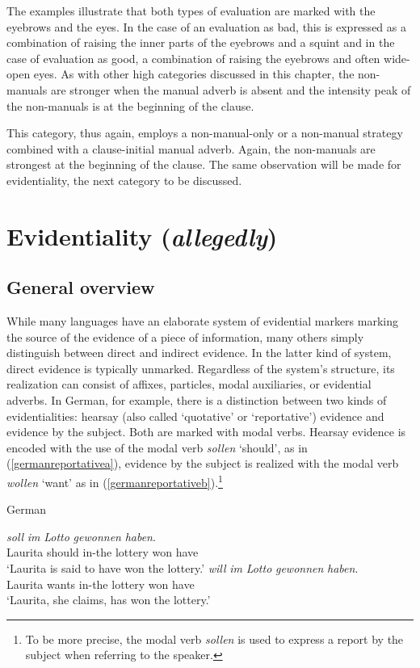 \noindent The examples illustrate that both types of evaluation are marked with the eyebrows and the eyes. In the case of an evaluation as bad, this is expressed as a combination of raising the inner parts of the eyebrows and a squint and in the case of evaluation as good, a combination of raising the eyebrows and often wide-open eyes.  As with other high categories discussed in this chapter, the non-manuals are stronger when the manual adverb is absent and the intensity peak of the non-manuals is at the beginning of the clause. 


This category, thus again, employs a non-manual-only or a non-manual strategy combined with a clause-initial manual adverb. Again, the non-manuals are strongest at the beginning of the clause. The same observation will be made for evidentiality, the next category to be discussed.

\section{Evidentiality (\textit{allegedly})}\label{evidentiality}


\subsection{General overview}

While many languages have an elaborate system of evidential markers marking the source of the evidence of a piece of information, many others simply distinguish between direct and indirect evidence. In the latter kind of system, direct evidence is typically unmarked. Regardless of the system's structure, its realization can consist of affixes, particles, modal auxiliaries, or evidential adverbs. In German, for example, there is a distinction between two kinds of evidentialities: hearsay (also called `quotative' or `reportative') evidence and evidence by the subject. Both are marked with modal verbs. Hearsay evidence is encoded with the use of the modal verb \textit{sollen} `should', as in (\ref{germanreportativea}), evidence by the subject is realized with the modal verb \textit{wollen} `want' as in (\ref{germanreportativeb}).\footnote{ To be more precise, the modal verb \textit{sollen} is used to express a report by the subject when referring to the speaker. }

\begin{exe} 
\ex German \begin{xlist} 
\ex {} {\textit{soll}} {\textit{im}} {\textit{Lotto}} {\textit{gewonnen}} {\textit{haben}.}  \\
{Laurita} {should} {in-the} {lottery} {won} {have}\\
\trans `Laurita is said to have won the lottery.' \label{germanreportativea}
\ex {} {\textit{will}} {\textit{im}} {\textit{Lotto}} {\textit{gewonnen}} {\textit{haben}.}  \\
{Laurita} {wants} {in-the} {lottery} {won} {have}\\
\trans `Laurita, she claims, has won the lottery.' \label{germanreportativeb}
\end{xlist} 
\end{exe}

